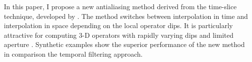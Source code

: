 In this paper, I propose a new antialiasing method derived from the
time-slice technique, developed by \cite{GEO56-06-07950805}. The
method switches between interpolation in time and interpolation in
space depending on the local operator dips. It is particularly
attractive for computing 3-D operators with rapidly varying dips and
limited aperture \cite[]{Fomel.sep.89.89}.  Synthetic examples show the
superior performance of the new method in comparison the temporal
filtering approach.



